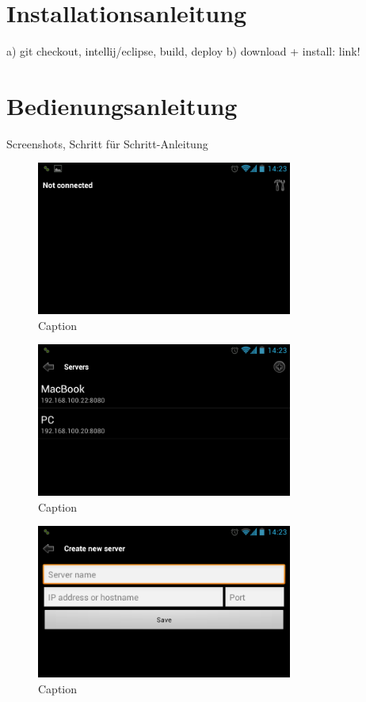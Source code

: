\documentclass[a4paper,12pt]{article}
\begin{document}
\newpage
\section{Installationsanleitung}
a) git checkout, intellij/eclipse, build, deploy
b) download + install: link!

\newpage
\section{Bedienungsanleitung}
Screenshots, Schritt für Schritt-Anleitung

\begin{figure}[H]
\centering
\includegraphics[width=0.75\textwidth]{Screenshot_1.png}
\caption{Caption}
\end{figure}

\begin{figure}[H]
\centering
\includegraphics[width=0.75\textwidth]{Screenshot_2.png}
\caption{Caption}
\end{figure}

\begin{figure}[H]
\centering
\includegraphics[width=0.75\textwidth]{Screenshot_3.png}
\caption{Caption}
\end{figure}
\end{document}
